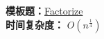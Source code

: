 \textbf{模板题：}\href{https://judge.yosupo.jp/problem/factorize}{Factorize}\\
\textbf{时间复杂度：} $O(n ^ {\frac{1}{4}})$

